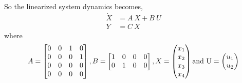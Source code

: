 \documentclass[french]{article}
\begin{document}
	So the linearized system dynamics becomes,
	\begin{align}
	\dot{X} &= A~ X + B~ U \nonumber\\
	Y &= C~ X
	\end{align}
	where 
	\begin{align}
	A = \begin{bmatrix}
	0 & 0 & 1 & 0 \\ 
	0 & 0 & 0 & 1 \\ 
	0 & 0 & 0 & 0 \\ 
	0 & 0 & 0 & 0
	\end{bmatrix}, B = \begin{bmatrix}
	1 & 0 & 0 & 0 \\ 
	0 & 1 & 0 & 0
	\end{bmatrix}, X = \begin{pmatrix}
	{x}_1 \\ 
	{x}_2 \\ 
	{x}_3 \\ 
	{x}_4
	\end{pmatrix} \rm{and} ~U = \begin{pmatrix}
	u_1 \\ 
	u_2
	\end{pmatrix}
	\end{align}
\end{document}
